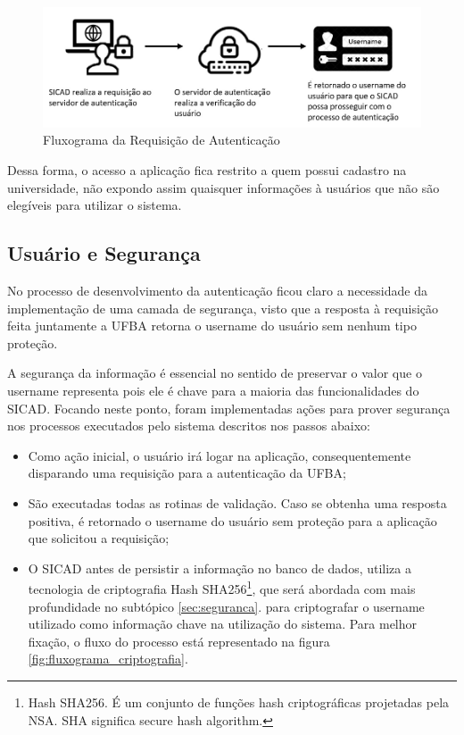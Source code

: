 \documentclass[12pt, a4paper]{report}
\begin{document}
\begin{figure}
\centering
\includegraphics[scale=0.50]{processo_autenticacao.jpg}
\caption{Fluxograma da Requisição de Autenticação}
\label{fig:processo_autenticacao}
\end{figure}

Dessa forma, o acesso a aplicação fica restrito a quem possui cadastro na universidade, não expondo assim quaisquer informações à usuários que não são elegíveis para utilizar o sistema.

\subsection{Usuário e Segurança}
\label{subsec:userseg}
No processo de desenvolvimento da autenticação ficou claro a necessidade da implementação de uma camada de segurança, visto que a resposta à requisição feita juntamente a \ac{UFBA} retorna o username do usuário sem nenhum tipo proteção.

A segurança da informação é essencial no sentido de preservar o valor que o username representa pois ele é chave para a maioria das funcionalidades do \ac{SICAD}. Focando neste ponto, foram implementadas ações para prover segurança nos processos executados pelo sistema descritos nos passos abaixo:

\begin{itemize}
\item Como ação inicial, o usuário irá logar na aplicação, consequentemente disparando uma requisição para a autenticação da \ac{UFBA};
\item São executadas todas as rotinas de validação.
Caso se obtenha uma resposta positiva, é retornado o username do usuário sem proteção para a aplicação que solicitou a requisição;
\item O \ac{SICAD} antes de persistir a informação no banco de dados, utiliza a tecnologia de criptografia Hash SHA256\footnote{Hash SHA256. É um conjunto de funções hash criptográficas projetadas pela NSA. SHA significa secure hash algorithm.}, que será abordada com mais profundidade no subtópico \ref{sec:seguranca}. para criptografar o username utilizado como informação chave na utilização do sistema. Para melhor fixação, o fluxo do processo está representado na figura \ref{fig:fluxograma_criptografia}.
\end{itemize}
\end{document}
